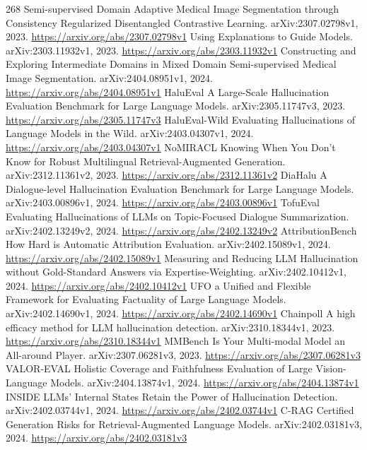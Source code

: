 \documentclass[11pt]{article}
\begin{document}
\begin{thebibliography}{268}
 Semi-supervised Domain Adaptive Medical Image Segmentation through Consistency Regularized Disentangled Contrastive Learning. arXiv:2307.02798v1, 2023. \url{https://arxiv.org/abs/2307.02798v1}
 Using Explanations to Guide Models. arXiv:2303.11932v1, 2023. \url{https://arxiv.org/abs/2303.11932v1}
 Constructing and Exploring Intermediate Domains in Mixed Domain Semi-supervised Medical Image Segmentation. arXiv:2404.08951v1, 2024. \url{https://arxiv.org/abs/2404.08951v1}
 HaluEval A Large-Scale Hallucination Evaluation Benchmark for Large Language Models. arXiv:2305.11747v3, 2023. \url{https://arxiv.org/abs/2305.11747v3}
 HaluEval-Wild Evaluating Hallucinations of Language Models in the Wild. arXiv:2403.04307v1, 2024. \url{https://arxiv.org/abs/2403.04307v1}
 NoMIRACL Knowing When You Don't Know for Robust Multilingual Retrieval-Augmented Generation. arXiv:2312.11361v2, 2023. \url{https://arxiv.org/abs/2312.11361v2}
 DiaHalu A Dialogue-level Hallucination Evaluation Benchmark for Large Language Models. arXiv:2403.00896v1, 2024. \url{https://arxiv.org/abs/2403.00896v1}
 TofuEval Evaluating Hallucinations of LLMs on Topic-Focused Dialogue Summarization. arXiv:2402.13249v2, 2024. \url{https://arxiv.org/abs/2402.13249v2}
 AttributionBench How Hard is Automatic Attribution Evaluation. arXiv:2402.15089v1, 2024. \url{https://arxiv.org/abs/2402.15089v1}
 Measuring and Reducing LLM Hallucination without Gold-Standard Answers via Expertise-Weighting. arXiv:2402.10412v1, 2024. \url{https://arxiv.org/abs/2402.10412v1}
 UFO a Unified and Flexible Framework for Evaluating Factuality of Large Language Models. arXiv:2402.14690v1, 2024. \url{https://arxiv.org/abs/2402.14690v1}
 Chainpoll A high efficacy method for LLM hallucination detection. arXiv:2310.18344v1, 2023. \url{https://arxiv.org/abs/2310.18344v1}
 MMBench Is Your Multi-modal Model an All-around Player. arXiv:2307.06281v3, 2023. \url{https://arxiv.org/abs/2307.06281v3}
 VALOR-EVAL Holistic Coverage and Faithfulness Evaluation of Large Vision-Language Models. arXiv:2404.13874v1, 2024. \url{https://arxiv.org/abs/2404.13874v1}
 INSIDE LLMs' Internal States Retain the Power of Hallucination Detection. arXiv:2402.03744v1, 2024. \url{https://arxiv.org/abs/2402.03744v1}
 C-RAG Certified Generation Risks for Retrieval-Augmented Language Models. arXiv:2402.03181v3, 2024. \url{https://arxiv.org/abs/2402.03181v3}

\end{thebibliography}
\end{document}
